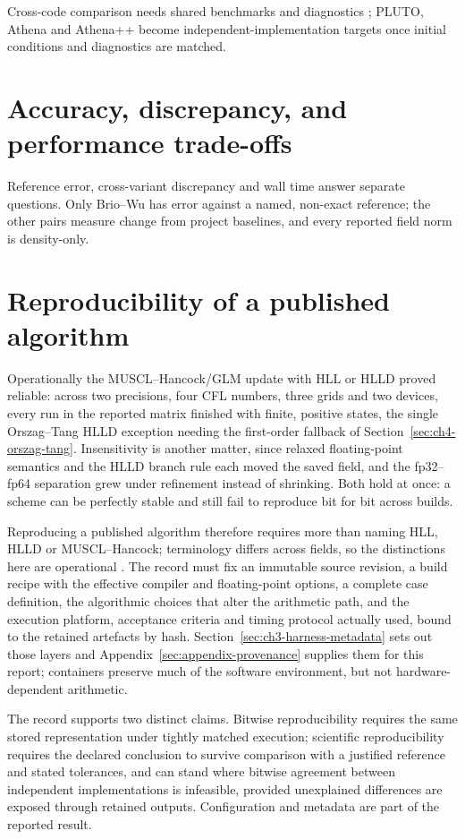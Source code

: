 Cross-code comparison needs shared benchmarks and diagnostics
\citep{kritsukEtAl2011comparison}; PLUTO, Athena and Athena++
\citep{mignoneEtAl2007pluto,stoneEtAl2008athena,stoneEtAl2020athenapp} become
independent-implementation targets once initial conditions and diagnostics are
matched.

\section{Accuracy, discrepancy, and performance trade-offs}
\label{sec:ch6-tradeoffs}

Reference error, cross-variant discrepancy and wall time answer separate
questions. Only Brio--Wu has error against a named, non-exact reference; the
other pairs measure change from project baselines, and every reported field
norm is density-only.

\section{Reproducibility of a published algorithm}
\label{sec:ch6-published-algorithm}

Operationally the MUSCL--Hancock/GLM update with HLL or HLLD proved reliable:
across two precisions, four CFL numbers, three grids and two devices, every
run in the reported matrix finished with finite, positive states, the single
Orszag--Tang HLLD exception needing the first-order fallback of
Section~\ref{sec:ch4-orszag-tang}. Insensitivity is another matter, since
relaxed floating-point semantics and the HLLD branch rule each moved the saved
field, and the fp32--fp64 separation grew under refinement instead of
shrinking. Both hold at once: a scheme can be perfectly stable and still fail
to reproduce bit for bit across builds.

Reproducing a published algorithm therefore requires more than naming HLL,
HLLD or MUSCL--Hancock; terminology differs across fields, so the distinctions
here are operational \citep{plesser2018reproducibility}. The record must fix an
immutable source revision, a build recipe with the effective compiler and
floating-point options, a complete case definition, the algorithmic choices
that alter the arithmetic path, and the execution platform, acceptance criteria
and timing protocol actually used, bound to the retained artefacts by hash.
Section~\ref{sec:ch3-harness-metadata} sets out those layers
\citep{sandveEtAl2013reproducible} and
Appendix~\ref{sec:appendix-provenance} supplies them for this report;
containers preserve much of the software environment, but not
hardware-dependent arithmetic.

The record supports two distinct claims. Bitwise reproducibility requires the
same stored representation under tightly matched execution; scientific
reproducibility requires the declared conclusion to survive comparison with a
justified reference and stated tolerances, and can stand where bitwise
agreement between independent implementations is infeasible, provided
unexplained differences are exposed through retained outputs. Configuration
and metadata are part of the reported result.
